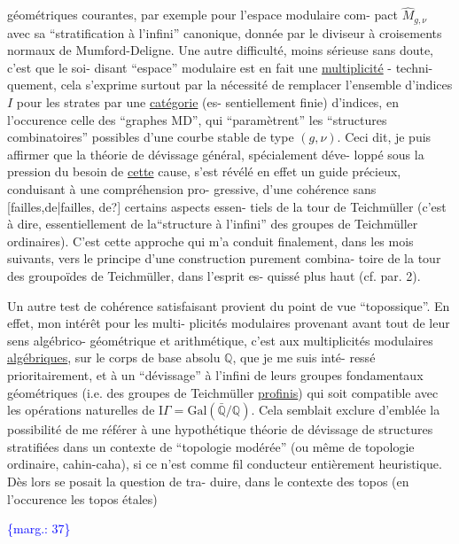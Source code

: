 \documentclass[11pt]{article}
\newcommand{\scanpage}[1]{\par\bigskip\noindent{\small\sffamily[scan #1]}\par}
\newcommand{\mspage}[1]{{\small\sffamily[p.\,#1]}}
\newcommand{\margin}[1]{\textcolor{blue}{\{\textsf{marg.:} #1\}}}
\newcommand{\uline}[1]{\underline{#1}}
\newcommand{\unsure}[1]{[#1?]}
\begin{document}
géométriques courantes, par exemple pour l'espace modulaire com-%
pact $\hat{M}_{g,\nu}$ avec sa ``stratification à l'infini'' canonique, donnée
par le diviseur à croisements normaux de Mumford-Deligne. Une
autre difficulté, moins sérieuse sans doute, c'est que le soi-%
disant ``espace'' modulaire est en fait une \uline{multiplicité} - techni-%
quement, cela s'exprime surtout par la nécessité de remplacer
l'ensemble d'indices $I$ pour les strates par une \uline{catégorie} (es-%
sentiellement finie) d'indices, en l'occurence celle des
``graphes MD'', qui ``paramètrent'' les ``structures combinatoires''
possibles d'une courbe stable de type $(g,\nu)$. Ceci dit, je puis
affirmer que la théorie de dévissage général, spécialement déve-%
loppé sous la pression du besoin de \uline{cette} cause, s'est révélé
en effet un guide précieux, conduisant à une compréhension pro-%
gressive, d'une cohérence sans \unsure{failles,de|failles, de} certains aspects essen-%
tiels de la tour de Teichmüller (c'est à dire, essentiellement
de la``structure à l'infini'' des groupes de Teichmüller ordinaires).
C'est cette approche qui m'a conduit finalement, dans les mois
suivants, vers le principe d'une construction purement combina-%
toire de la tour des groupoïdes de Teichmüller, dans l'esprit es-%
quissé plus haut (cf. par. 2).

Un autre test de cohérence satisfaisant provient du
point de vue ``topossique''. En effet, mon intérêt pour les multi-%
plicités modulaires provenant avant tout de leur sens algébrico-%
géométrique et arithmétique, c'est aux multiplicités modulaires
\uline{algébriques}, sur le corps de base absolu $\mathbb{Q}$, que je me suis inté-%
ressé prioritairement, et à un ``dévissage'' à l'infini de leurs
groupes fondamentaux géométriques (i.e. des groupes de Teichmüller
\uline{profinis}) qui soit compatible avec les opérations naturelles de
$\mathrm{I}\!\Gamma = \mathrm{Gal}(\bar{\mathbb{Q}}/\mathbb{Q})$. Cela semblait exclure d'emblée la possibilité de me
référer à une hypothétique théorie de dévissage de structures
stratifiées dans un contexte de ``topologie modérée'' (ou même de
topologie ordinaire, cahin-caha), si ce n'est comme fil conducteur
entièrement heuristique. Dès lors se posait la question de tra-%
duire, dans le contexte des topos (en l'occurence les topos étales)

\margin{37}

\clearpage
\scanpage{119/38}
\mspage{36}
\end{document}
